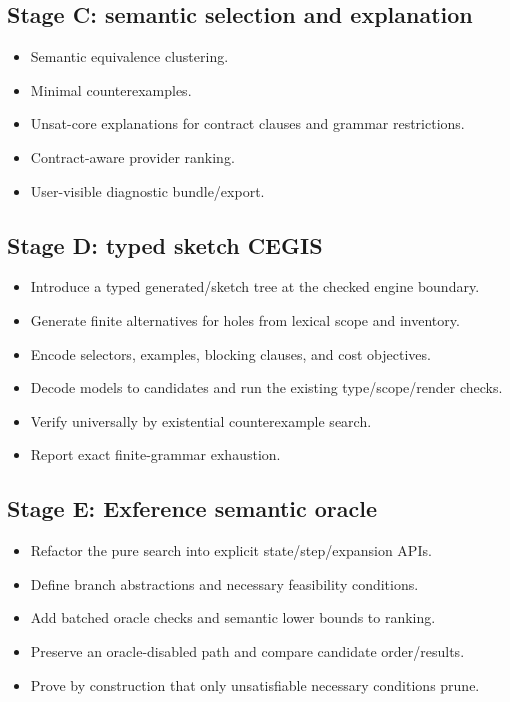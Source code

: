 \documentclass[11pt,oneside]{article}
\begin{document}
\subsection{Stage C: semantic selection and explanation}

\begin{itemize}
  \item Semantic equivalence clustering.
  \item Minimal counterexamples.
  \item Unsat-core explanations for contract clauses and grammar restrictions.
  \item Contract-aware provider ranking.
  \item User-visible diagnostic bundle/export.
\end{itemize}

\subsection{Stage D: typed sketch CEGIS}

\begin{itemize}
  \item Introduce a typed generated/sketch tree at the checked engine boundary.
  \item Generate finite alternatives for holes from lexical scope and inventory.
  \item Encode selectors, examples, blocking clauses, and cost objectives.
  \item Decode models to candidates and run the existing type/scope/render checks.
  \item Verify universally by existential counterexample search.
  \item Report exact finite-grammar exhaustion.
\end{itemize}

\subsection{Stage E: Exference semantic oracle}

\begin{itemize}
  \item Refactor the pure search into explicit state/step/expansion APIs.
  \item Define branch abstractions and necessary feasibility conditions.
  \item Add batched oracle checks and semantic lower bounds to ranking.
  \item Preserve an oracle-disabled path and compare candidate order/results.
  \item Prove by construction that only unsatisfiable necessary conditions prune.
\end{itemize}
\end{document}
